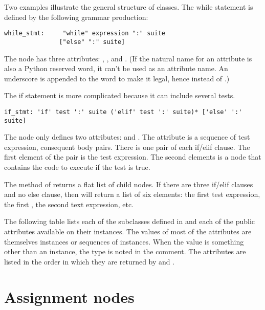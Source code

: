\documentclass{manual}
\begin{document}
Two examples illustrate the general structure of 
classes.  The while statement is defined by the following grammar
production: 

\begin{verbatim}
while_stmt:     "while" expression ":" suite
               ["else" ":" suite]
\end{verbatim}

The  node has three attributes: ,
, and .  (If the natural name for an
attribute is also a Python reserved word, it can't be used as an
attribute name.  An underscore is appended to the word to make it
legal, hence  instead of .)

The if statement is more complicated because it can include several
tests.  

\begin{verbatim}
if_stmt: 'if' test ':' suite ('elif' test ':' suite)* ['else' ':' suite]
\end{verbatim}

The  node only defines two attributes:  and
.  The  attribute is a sequence of test
expression, consequent body pairs.  There is one pair of each if/elif
clause.  The first element of the pair is the test expression.  The
second elements is a  node that contains the code to
execute if the test is true.

The  method of  returns a flat list of
child nodes.  If there are three if/elif clauses and no else clause,
then  will return a list of six elements: the
first test expression, the first , the second text
expression, etc.

The following table lists each of the  subclasses defined
in  and each of the public attributes available
on their instances.  The values of most of the attributes are
themselves  instances or sequences of instances.  When the
value is something other than an instance, the type is noted in the
comment.  The attributes are listed in the order in which they are
returned by  and .



\section{Assignment nodes}
\end{document}

